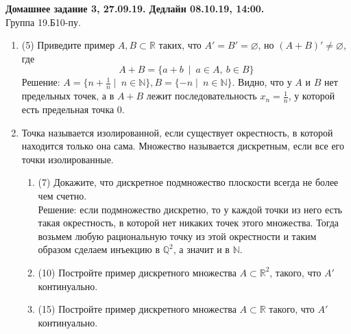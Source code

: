 \documentclass[a4paper]{article}
\begin{document}
\newcommand\HeaderDZ[5]{
\begin{center}
		\textbf{Домашнее задание #3, #2. Дедлайн #4, #5.}\\
		Группа #1.Б10-пу.\\
\end{center}
\vspace{-\baselineskip}
\bigskip
\bigskip
}



\renewcommand{\labelenumii}{\arabic{enumii})}
\renewcommand{\labelenumiii}{\roman{enumiii})}

\HeaderDZ{19}{27.09.19}{3}{08.10.19}{14:00}

\begin{enumerate}
    \item (5) Приведите пример $A, B\subset \mathbb R$ таких, что $A' = B' = \varnothing$, но $(A + B)'\neq \varnothing$, где
    \[
        A+B = \{a+b\ \mid\ a\in A,\ b\in B\}
    \]
    Решение: $A = \{n + \frac{1}{n}\mid\ n\in \mathbb N\}, B = \{-n\mid\ n\in \mathbb N\}$. Видно, что у $A$ и $B$ нет предельных точек, а в $A+B$ лежит последовательность $x_n = \frac{1}{n}$, у которой есть предельная точка 0.
    \item Точка называется изолированной, если существует окрестность, в которой находится только она сама. Множество называется дискретным, если все его точки изолированные. 
	\begin{enumerate}
		\item (7) Докажите, что дискретное подмножество плоскости всегда не более чем счетно.\\
		Решение: если подмножество дискретно, то у каждой точки из него есть такая окрестность, в которой нет никаких точек этого множества. Тогда возьмем любую рациональную точку из этой окрестности и таким образом сделаем инъекцию в $\mathbb Q^2$, а значит и в $\mathbb N$. 
		\item (10) Постройте пример дискретного множества $A\subset \mathbb R^2$, такого, что $A'$ континуально.
		\item (15) Постройте пример дискретного множества $A\subset\mathbb R$ такого, что $A'$ континуально.
	\end{enumerate}
	

\end{enumerate}
\end{document}
